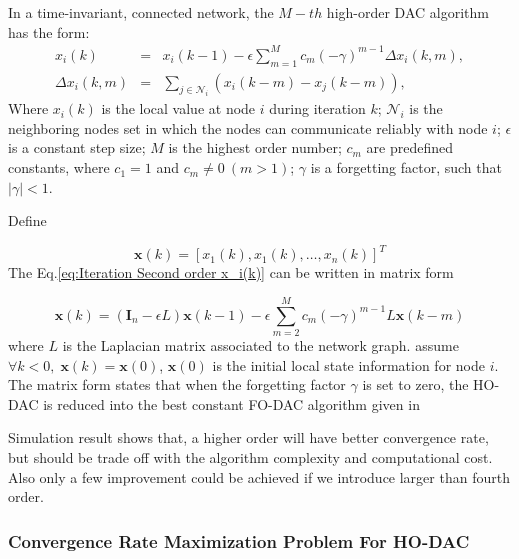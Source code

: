 In a time-invariant, connected network, the $M-th$ high-order DAC
algorithm has the form:
\begin{eqnarray}
x_{i}(k) & = & x_{i}(k-1)-\epsilon\sum_{m=1}^{M}c_{m}(-\gamma)^{m-1}\Delta x_{i}(k,m),\label{eq:Iteration Second order x_i(k)}\\
\Delta x_{i}(k,m) & = & \sum_{j\in\mathcal{N}_{i}}\left(x_{i}\left(k-m\right)-x_{j}\left(k-m\right)\right),
\end{eqnarray}
Where $x_{i}(k)$ is the local value at node $i$ during iteration
$k$; $\mathcal{N}_{i}$ is the neighboring nodes set in which the
nodes can communicate reliably with node $i$; $\epsilon$ is a constant
step size; $M$ is the highest order number; $c_{m}$ are predefined
constants, where $c_{1}=1$ and $c_{m}\neq0\:(m>1)$; $\gamma$ is
a forgetting factor, such that $\left|\gamma\right|<1$. 

Define

\begin{equation}
\mathbf{x}(k)=\left[x_{1}(k),x_{1}(k),\ldots,x_{n}(k)\right]^{T}
\end{equation}
The Eq.\ref{eq:Iteration Second order x_i(k)} can be written in matrix
form

\begin{equation}
\mathbf{x}(k)=(\mathbf{I}_{n}-\epsilon L)\mathbf{x}(k-1)-\epsilon\sum_{m=2}^{M}c_{m}(-\gamma)^{m-1}L\mathbf{x}(k-m)\label{eq:High Order Iter.Vec}
\end{equation}
where $L$ is the Laplacian matrix associated to the network
graph. assume $\forall k<0,\;\mathbf{x}(k)=\mathbf{x}(0)$, $\mathbf{x}(0)$
is the initial local state information for node $i$. The matrix form
states that when the forgetting factor $\gamma$ is set to zero, the
HO-DAC is reduced into the best constant FO-DAC algorithm given in 

Simulation result shows that, a higher order will have better convergence
rate, but should be trade off with the algorithm complexity and computational
cost. Also only a few improvement could be achieved if we introduce
larger than fourth order. 


\subsubsection{Convergence Rate Maximization Problem For HO-DAC}

